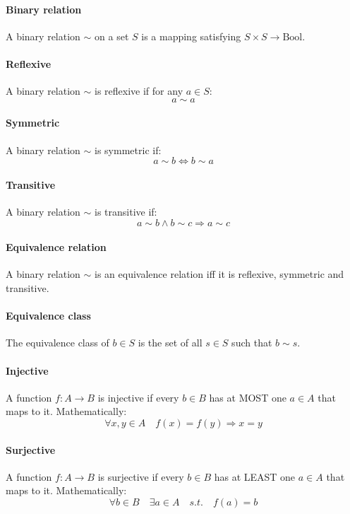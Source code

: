 \documentclass{scrartcl}
\begin{document}
\paragraph{Binary relation}
A binary relation $ \sim $ on a set $ S $ is a mapping satisfying $ S \times S \to \textrm{Bool} $.
\paragraph{Reflexive}
A binary relation $ \sim $ is reflexive if for any $ a \in S $:
\begin{equation}
a \sim a
\end{equation}
\paragraph{Symmetric}
A binary relation $ \sim $ is symmetric if:
\begin{equation}
a \sim b \Leftrightarrow b \sim a
\end{equation}
\paragraph{Transitive}
A binary relation $ \sim $ is transitive if:
\begin{equation}
a \sim b \land b \sim c \Rightarrow a \sim c
\end{equation}
\paragraph{Equivalence relation}
A binary relation $ \sim $ is an equivalence relation iff it is reflexive, symmetric and transitive.
\paragraph{Equivalence class}
The equivalence class of $ b \in S $ is the set of all $ s \in S $ such that $ b \sim s $.
\paragraph{Injective}
A function $ f : A \to B $ is injective if every $ b \in B $ has at MOST one $ a \in A $ that maps to it. Mathematically:
\begin{equation}
\forall x, y \in A \quad f(x) = f(y) \Rightarrow x = y
\end{equation}
\paragraph{Surjective}
A function $ f : A \to B $ is surjective if every $ b \in B $ has at LEAST one $ a \in A $ that maps to it. Mathematically:
\begin{equation}
\forall b \in B \quad \exists a \in A \quad s.t. \quad f(a) = b
\end{equation}
\end{document}
